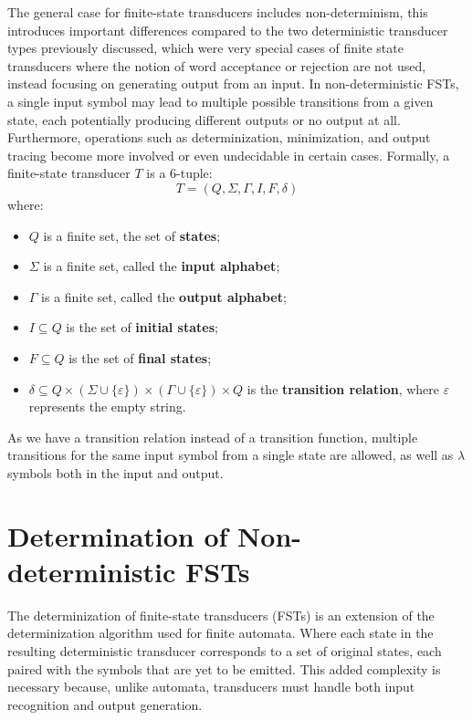 The general case for finite-state transducers includes non-determinism, 
this introduces important differences compared to the two deterministic transducer types previously discussed, which were very special cases of finite state transducers
where the notion of word acceptance or rejection are not used, instead focusing on generating output from an input. 
In non-deterministic FSTs, a single input symbol may lead to multiple possible transitions from a given state, 
each potentially producing different outputs or no output at all. 
Furthermore, operations such as determinization, minimization, and output tracing become more involved or even undecidable in certain cases. 
Formally, a finite-state transducer $T$ is a 6-tuple: \cite{finite_state_transducer}
\[
T = (Q, \Sigma, \Gamma, I, F, \delta)
\]
where:
\begin{itemize}
    \item $Q$ is a finite set, the set of \textbf{states};
    \item $\Sigma$ is a finite set, called the \textbf{input alphabet};
    \item $\Gamma$ is a finite set, called the \textbf{output alphabet};
    \item $I \subseteq Q$ is the set of \textbf{initial states};
    \item $F \subseteq Q$ is the set of \textbf{final states};
    \item $\delta \subseteq Q \times (\Sigma \cup \{\varepsilon\}) \times (\Gamma \cup \{\varepsilon\}) \times Q$ 
    is the \textbf{transition relation}, where $\varepsilon$ represents the empty string.
\end{itemize}

As we have a transition relation instead of a transition function, multiple transitions for the same input symbol from a single state are allowed,
as well as \(\lambda\) symbols both in the input and output.

\section*{Determination of Non-deterministic FSTs}

The determinization of finite-state transducers (FSTs) is an extension of the determinization algorithm used for finite automata. 
Where each state in the resulting deterministic transducer corresponds to a set of original states, 
each paired with the symbols that are yet to be emitted. This added complexity is necessary because, unlike automata, 
transducers must handle both input recognition and output generation.

